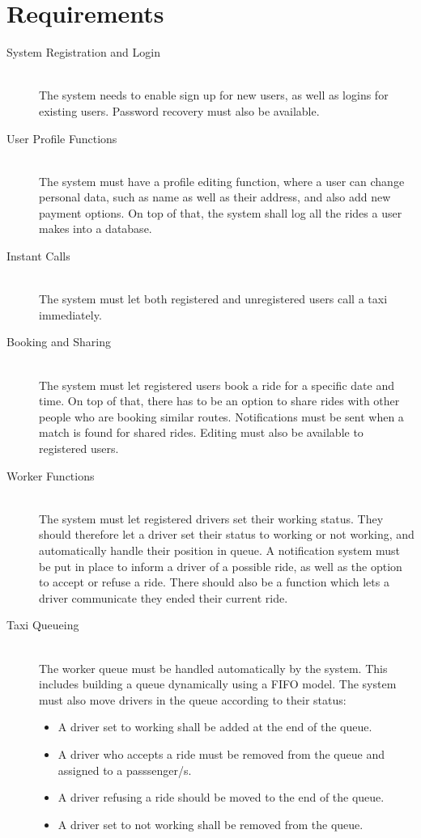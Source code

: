 \section{Requirements}

\begin{description}
        \item[System Registration and Login] \hfill \\
		The system needs to enable sign up for new users, as well as logins for existing users. Password recovery must also be available.
        \item[User Profile Functions] \hfill \\
		The system must have a profile editing function, where a user can change personal data, such as name as well as their address, 
		and also add new payment options. On top of that, the system shall log all the rides a user makes into a database.
		\item[Instant Calls] \hfill \\
		The system must let both registered and unregistered users call a taxi immediately. 
		\item[Booking and Sharing] \hfill \\
		The system must let registered users book a ride for a specific date and time. On top of that, there has to be an option to share
		rides with other people who are booking similar routes. Notifications must be sent when a match is found for shared rides. Editing must
		also be available to registered users.
		\item[Worker Functions] \hfill \\
		The system must let registered drivers set their working status. They should therefore let a driver set their status to working or not
		working, and automatically handle their position in queue. A notification system must be put in place to inform a driver of a possible
		ride, as well as the option to accept or refuse a ride.	There should also be a function which lets a driver communicate they ended their
		current ride.
		\item[Taxi Queueing] \hfill \\
		The worker queue must be handled automatically by the system. This includes building a queue dynamically using a FIFO model. The system
		must also move drivers in the queue according to their status:
			\begin{itemize}
				\item A driver set to working shall be added at the end of the queue.
				\item A driver who accepts a ride must be removed from the queue and assigned to a passsenger/s.
				\item A driver refusing a ride should be moved to the end of the queue.
				\item A driver set to not working shall be removed from the queue.
			\end{itemize}
\end{description}
\newpage
